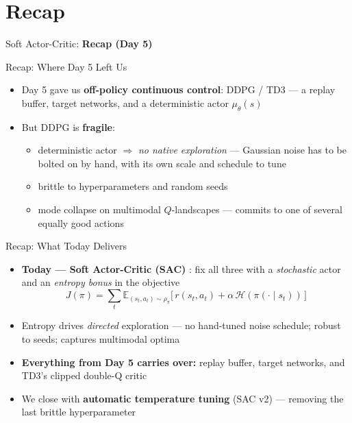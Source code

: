 \section{Recap}
\begin{frame}{}
    \LARGE Soft Actor-Critic: \textbf{Recap (Day 5)}
\end{frame}

\begin{frame}{Recap: Where Day 5 Left Us}
\begin{itemize}
    \item Day 5 gave us \textbf{off-policy continuous control}: DDPG  / TD3  --- a replay buffer, target networks, and a deterministic actor $\mu_\theta(s)$
    \pause
    \item But DDPG is \textbf{fragile}:
    \begin{itemize}
        \item deterministic actor $\Rightarrow$ \emph{no native exploration} --- Gaussian noise has to be bolted on by hand, with its own scale and schedule to tune
        \item brittle to hyperparameters and random seeds
        \item mode collapse on multimodal $Q$-landscapes --- commits to one of several equally good actions
    \end{itemize}
\end{itemize}
\end{frame}

\begin{frame}{Recap: What Today Delivers}
\begin{itemize}
    \item \textbf{Today --- Soft Actor-Critic (SAC)} : fix all three with a \emph{stochastic} actor and an \emph{entropy bonus} in the objective
    $$J(\pi) = \sum_t \mathbb{E}_{(s_t,a_t)\sim\rho_\pi}\big[\, r(s_t,a_t) + \alpha\,\mathcal{H}(\pi(\cdot\mid s_t)) \,\big]$$
    \item Entropy drives \emph{directed} exploration --- no hand-tuned noise schedule; robust to seeds; captures multimodal optima
    \item \textbf{Everything from Day 5 carries over:} replay buffer, target networks, and TD3's clipped double-Q critic
    \item We close with \textbf{automatic temperature tuning} (SAC v2) --- removing the last brittle hyperparameter
\end{itemize}
\end{frame}

